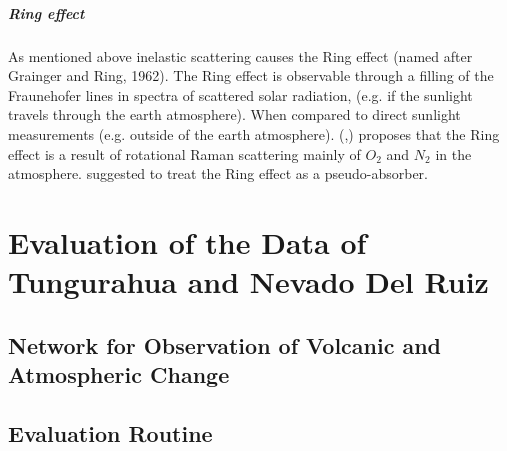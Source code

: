 \documentclass  [
  paper    = a4,
  BCOR     = 10mm,
  twoside,
  fontsize = 12pt,
  fleqn,
  toc      = bibnumbered,
  toc      = listofnumbered,
  numbers  = noendperiod,
  headings = normal,
  listof   = leveldown,
  version  = 3.03
]                                       {scrreprt}
\begin{document}
	\subsubsection*{Ring effect}
	As mentioned above inelastic scattering causes the Ring effect (named after Grainger and Ring, 1962).
	The Ring effect is observable through a filling of the Fraunehofer lines in spectra of scattered solar radiation, (e.g. if the sunlight travels through the earth atmosphere). When compared to direct sunlight measurements (e.g. outside of the earth atmosphere).
	(\cite{bussemer1993ring},\cite{solomon1987interpretation}) proposes that the Ring effect is a result of  rotational Raman scattering mainly of
	$O_2$ and $N_2$ in the atmosphere.
	\cite{solomon1987interpretation} suggested to treat the Ring effect as a pseudo-absorber. 


	
	\part{Evaluation of the Data of Tungurahua and Nevado Del Ruiz}
	
	
	\chapter{Network for Observation of Volcanic and Atmospheric Change \label{NOVAC}}
	
	
	\chapter{Evaluation Routine}
	
\end{document}
